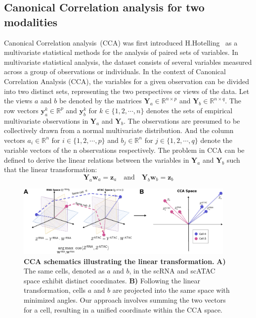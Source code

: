 \subsection{Canonical Correlation analysis for two modalities}
Canonical Correlation analysis~(CCA) was first introduced H.Hotelling~\citep{hotelling1935cca1,HOTELLING1936cca2} as a multivariate statistical methods for the analysis of paired sets of variables. In multivariate statistical analysis, the dataset consists of several variables measured across a group of observations or individuals. In the context of Canonical Correlation Analysis (CCA), the variables for a given observation can be divided into two distinct sets, representing the two perspectives or views of the data. Let the views $a$ and $b$ be denoted by the matrices $\mathbf{Y}_a\in\mathbb{R}^{n\times p}$ and $\mathbf{Y}_b\in \mathbb{R}^{n\times q}$. The row vectors $\mathbf{y}_a^k\in \mathbb{R}^{p}$ and $\mathbf{y}_b^k$ for $k\in\{1,2,\cdots, n\}$ denotes the sets of empirical multivariate observations in $\mathbf{Y}_a$ and $\mathbf{Y}_b$. The observations are presumed to be collectively drawn from a normal multivariate distribution. And the column vectors $a_i\in \mathbb{R}^n$ for $i\in \{1,2,\cdots, p\}$ and $b_j\in \mathbb{R}^n$ for ${j\in \{1,2,\cdots, q\}}$ denote the variable vectors of the n observations respectively. The problem in CCA can be defined to derive the linear relations between the variables in $\mathbf{Y}_a$ and $\mathbf{Y}_b$ such that the linear transformation:
\begin{equation}
\mathbf{Y}_a\mathbf{w}_a=\mathbf{z}_a\quad\text{and}\quad \mathbf{Y}_b\mathbf{w}_b=\mathbf{ z}_b
\end{equation}

\begin{figure}[!ht]
    \centering
    \includegraphics[width=0.95\textwidth]{CCA_ADD/fig}
    \vspace{0.1cm}
    \caption[CCA schematic showing the linear transformation.]{\textbf{CCA schematics illustrating the linear transformation.} \textbf{A)} The same cells, denoted as $a$ and $b$, in the scRNA and scATAC space exhibit distinct coordinates. \textbf{B)} Following the linear transformation, cells $a$ and $b$ are projected into the same space with minimized angles. Our approach involves summing the two vectors for a cell, resulting in a unified coordinate within the CCA space.}
    \label{fig:CCA_ADD}
\end{figure}

